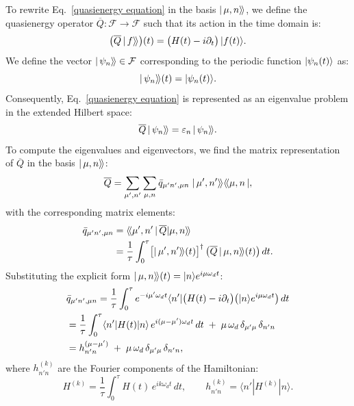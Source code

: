 To rewrite Eq.~\eqref{quasienergy equation} in the basis $|\,\mu,n\rangle\!\rangle$, we define the quasienergy operator $\overline{Q}:\mathcal{F}\to\mathcal{F}$ such that its action in the time domain is:
\begin{equation}
    \bigl(\overline{Q}\,|\,f\rangle\!\rangle\bigr)(t) = \bigl(H(t)-i\partial_{t}\bigr)\,|f(t)\rangle.
\end{equation}
We define the vector $|\,\psi_n\rangle\!\rangle \in \mathcal{F}$ corresponding to the periodic function $|\psi_n(t)\rangle$ as:
\begin{equation}
    \label{eigenvector definition}
    |\,\psi_n\rangle\!\rangle(t) = |\psi_n(t)\rangle.
\end{equation}
Consequently, Eq.~\eqref{quasienergy equation} is represented as an eigenvalue problem in the extended Hilbert space:
\begin{equation}
    \label{evals equation}
    \overline{Q}\,|\,\psi_n\rangle\!\rangle = \varepsilon_n\,|\,\psi_n\rangle\!\rangle.
\end{equation}
To compute the eigenvalues and eigenvectors, we find the matrix representation of $\overline{Q}$ in the basis $|\,\mu,n\rangle\!\rangle$:
\begin{equation}
    \overline{Q} = \sum_{\mu',n'}\sum_{\mu,n} \bar{q}_{\mu' n',\mu n}\;|\,\mu',n'\rangle\!\rangle\langle\!\langle\mu,n\,|,
\end{equation}
with the corresponding matrix elements:
\begin{align}
    \bar{q}_{\mu' n',\mu n}
    &= \langle\!\langle\mu',n'\,|\,\overline{Q}|\mu,n\rangle\!\rangle \nonumber\\
    &= \frac{1}{\tau}\int_{0}^{\tau} \bigl[|\,\mu',n'\rangle\!\rangle(t)\bigr]^\dagger\, \bigl(\overline{Q}\,|\,\mu,n\rangle\!\rangle(t)\bigr)\,dt.
\end{align}
Substituting the explicit form $|\,\mu,n\rangle\!\rangle(t)=|n\rangle e^{i\mu\omega_d t}$:
\begin{align}
    &\bar{q}_{\mu' n',\mu n}
    = \frac{1}{\tau}\int_{0}^{\tau} e^{-i\mu'\omega_d t} \langle n'| \bigl(H(t)-i\partial_t\bigr) \bigl(|n\rangle e^{i\mu\omega_d t}\bigr) \,dt \nonumber \\
    &= \frac{1}{\tau}\int_{0}^{\tau} \langle n'|H(t)|n\rangle\,e^{i(\mu-\mu')\omega_d t}\,dt \;+\; \mu\,\omega_d\,\delta_{\mu'\mu}\,\delta_{n'n} \nonumber \\
    &= h_{n' n}^{(\mu-\mu')} \;+\; \mu\,\omega_d\,\delta_{\mu'\mu}\,\delta_{n'n},
\end{align}
where $h_{n'n}^{(k)}$ are the Fourier components of the Hamiltonian:
\begin{equation}
    H^{(k)} = \frac{1}{\tau}\int_{0}^{\tau} H(t)\,e^{ik\omega_d t}\,dt, \qquad h^{(k)}_{n' n}=\langle n'|H^{(k)}|n\rangle.
\end{equation}
